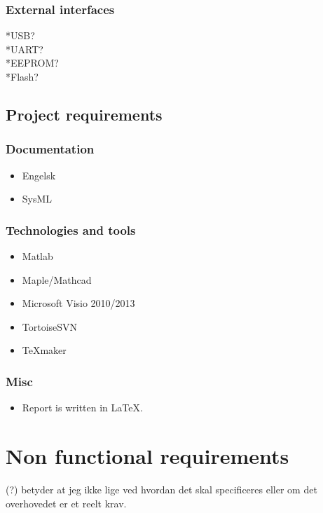 \subsubsection{External interfaces}
*USB?\\
*UART?\\
*EEPROM?\\
*Flash?\\

\subsection{Project requirements}

\subsubsection{Documentation}
\begin{itemize}
\item Engelsk
\item SysML
\end{itemize}

\subsubsection{Technologies and tools}
\begin{itemize}
\item Matlab
\item Maple/Mathcad
\item Microsoft Visio 2010/2013
\item TortoiseSVN
\item TeXmaker
\end{itemize}

\subsubsection{Misc}
\begin{itemize}
\item Report is written in LaTeX.
\end{itemize}

\section{Non functional requirements}
(?) betyder at jeg ikke lige ved hvordan det skal specificeres eller om det overhovedet er et reelt krav.\\
